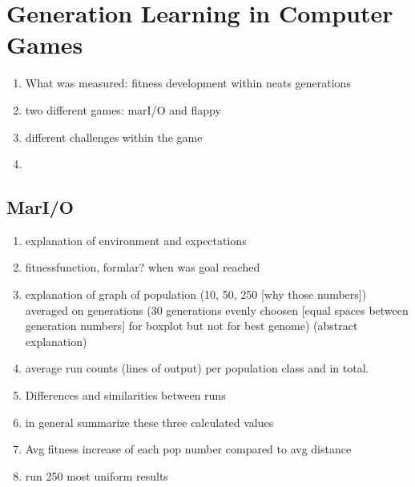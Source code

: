 %
\chapter{Generation Learning in Computer Games}
\label{sec:analysis}

\begin{enumerate}
	\item What was measured: fitness development within neats generations 
	\item two different games: marI/O and flappy
	\item different challenges within the game
	\item 
\end{enumerate}

	\section{MarI/O}
		\label{sec:analysis:mario}
		
		
		\begin{enumerate}
			\item explanation of environment and expectations
			\item fitnessfunction, formlar? when was goal reached
			\item explanation of graph of population (10, 50, 250 [why those numbers]) averaged on generations (30 generations evenly choosen [equal spaces between generation numbers] for boxplot but not for best genome)  (abstract explanation)
			\item average run counts (lines of output) per population class and in total.
			\item Differences and similarities between runs 
			\item in general summarize these three calculated values
			\item Avg fitness increase of each pop number compared to avg distance 
			\item run 250 most uniform results
		\end{enumerate}
		
